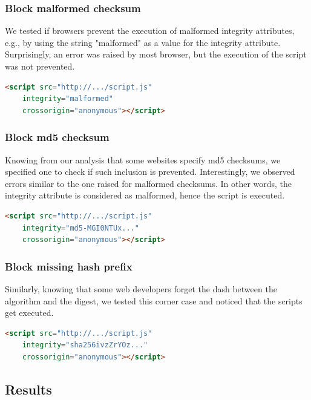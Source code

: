 \documentclass[sigconf,table]{acmart}
\begin{document}
\subsubsection{Block malformed checksum}
We tested if browsers prevent the execution of malformed integrity attributes, e.g., by using the string "malformed" as a value for the integrity attribute.
Surprisingly, an error was raised by most browser, but the execution of the script was not prevented.

\begin{lstlisting}[language=HTML, basicstyle=\small]
<script src="http://.../script.js" 
	integrity="malformed" 
	crossorigin="anonymous"></script>
\end{lstlisting}

\subsubsection{Block md5 checksum}
Knowing from our analysis that some websites specify md5 checksums, we specified one to check if such inclusion is prevented.
Interestingly, we observed errors similar to the one raised for malformed checksums.
In other words, the integrity attribute is considered as malformed, hence the script is executed.

\begin{lstlisting}[language=HTML, basicstyle=\small]
<script src="http://.../script.js" 
	integrity="md5-MGI0NTUx..." 
	crossorigin="anonymous"></script>
\end{lstlisting}

\subsubsection{Block missing hash prefix}
Similarly, knowing that some web developers forget the dash between the algorithm and the digest, we tested this corner case and noticed that the scripts get executed.

\begin{lstlisting}[language=HTML, basicstyle=\small]
<script src="http://.../script.js" 
	integrity="sha256ivzZrYOz..." 
	crossorigin="anonymous"></script>
\end{lstlisting}

\subsection{Results}
\end{document}
